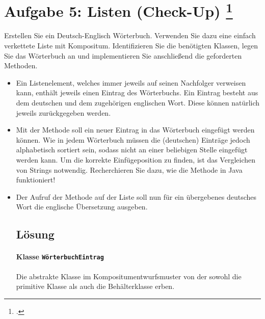 \documentclass{lehramt-informatik-aufgabe}
\begin{document}

\section{Aufgabe 5: Listen (Check-Up)
\footcite[Seite 4, Aufgabe 5]{aud:ab:5}
}

Erstellen Sie ein Deutsch-Englisch Wörterbuch. Verwenden Sie dazu eine
einfach verkettete Liste mit Kompositum. Identifizieren Sie die
benötigten Klassen, legen Sie das Wörterbuch an und implementieren Sie
anschließend die geforderten Methoden.

\begin{itemize}
\item Ein Listenelement, welches immer jeweils auf seinen Nachfolger
verweisen kann, enthält jeweils einen Eintrag des Wörterbuchs. Ein
Eintrag besteht aus dem deutschen und dem zugehörigen englischen Wort.
Diese können natürlich jeweils zurückgegeben werden.

\item Mit der Methode 
soll ein neuer Eintrag in das Wörterbuch eingefügt werden können. Wie in
jedem Wörterbuch müssen die (deutschen) Einträge jedoch alphabetisch
sortiert sein, sodass nicht an einer beliebigen Stelle eingefügt werden
kann. Um die korrekte Einfügeposition zu finden, ist das Vergleichen von
Strings notwendig. Recherchieren Sie dazu, wie die Methode
 in Java funktioniert!

\item Der Aufruf der Methode  auf der
Liste soll nun für ein übergebenes deutsches Wort die englische
Übersetzung ausgeben.

%

\subsection{Lösung}

\paragraph{Klasse \texttt{WörterbuchEintrag}}

Die abstrakte Klasse im Kompositumentwurfsmuster von der sowohl die
primitive Klasse als auch die Behälterklasse erben.

\begin{liAntwort}
\end{liAntwort}


\end{itemize}
\end{document}
